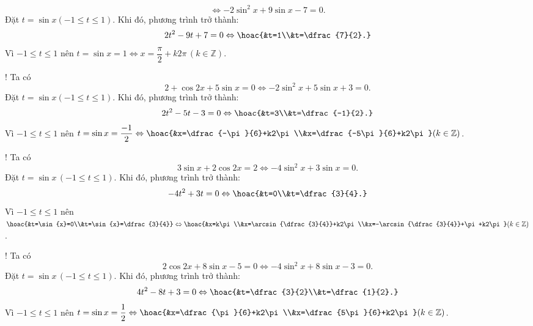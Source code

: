\begin{bt}
{\begin{listEX}[2]
$$			\Leftrightarrow -2\sin^2{x}+9\sin{x}-7=0.
			$$
			Đặt $t=\sin{x}(-1\le t\le 1)$. Khi đó, phương trình trở thành:
			$$
			2t^2-9t+7=0 \Leftrightarrow \hoac{&t=1\\&t=\dfrac{7}{2}.}
			$$
			Vì $-1\le t\le 1$ nên $t=\sin{x}=1\Leftrightarrow x=\dfrac{\pi}{2}+k2\pi\,(k\in\mathbb{Z})$.
			\item! Ta có
			$$
			2+\cos{2x}+5\sin{x}=0 \Leftrightarrow -2\sin^2{x}+5\sin{x}+3=0.
			$$
			Đặt $t=\sin{x}(-1\le t\le 1)$. Khi đó, phương trình trở thành:
			$$
			2t^2-5t-3=0 \Leftrightarrow \hoac{&t=3\\&t=\dfrac{-1}{2}.}
			$$
			Vì $-1\le t\le 1$ nên $t=\sin{x}=\dfrac{-1}{2}\Leftrightarrow\hoac{&x=\dfrac{-\pi}{6}+k2\pi\\&x=\dfrac{-5\pi}{6}+k2\pi}(k\in\mathbb{Z})$.
			\item! Ta có
			$$
			3\sin{x}+2\cos{2x}=2 \Leftrightarrow -4\sin^2{x}+3\sin{x}=0.
			$$
			Đặt $t=\sin{x}\,(-1\le t\le 1)$. Khi đó, phương trình trở thành:
			$$
			-4t^2+3t=0 \Leftrightarrow \hoac{&t=0\\&t=\dfrac{3}{4}.}
			$$
			Vì $-1\le t\le 1$ nên $\hoac{&t=\sin{x}=0\\&t=\sin{x}=\dfrac{3}{4}}\Leftrightarrow \hoac{&x=k\pi\\&x=\arcsin{\dfrac{3}{4}}+k2\pi\\&x=-\arcsin{\dfrac{3}{4}}+\pi+k2\pi}(k\in\mathbb{Z})$.
			\item! Ta có
			$$
			2\cos{2x}+8\sin{x}-5=0 \Leftrightarrow -4\sin^2{x}+8\sin{x}-3=0.
			$$
			Đặt $t=\sin{x}\,(-1\le t\le 1)$. Khi đó, phương trình trở thành:
			$$
			4t^2-8t+3=0 \Leftrightarrow \hoac{&t=\dfrac{3}{2}\\&t=\dfrac{1}{2}.}
			$$
			Vì $-1\le t\le 1$ nên $t=\sin{x}=\dfrac{1}{2}\Leftrightarrow\hoac{&x=\dfrac{\pi}{6}+k2\pi\\&x=\dfrac{5\pi}{6}+k2\pi}(k\in\mathbb{Z})$.
		\end{listEX}
	}
\end{bt}

